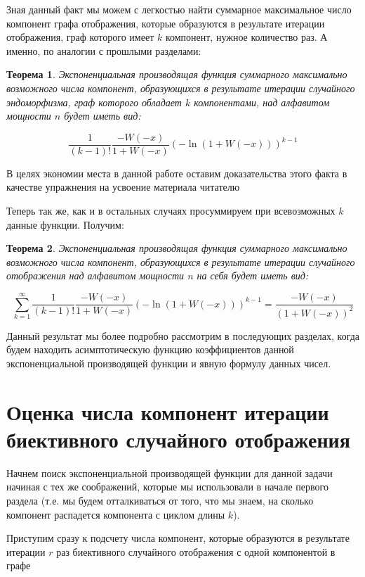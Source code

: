 \documentclass[10pt, a4paper]{report}
\newtheorem{theorem}{Теорема}[chapter]
\theoremstyle{definition}
\renewcommand{\log}{\ln}
\begin{document}
Зная данный факт мы можем с легкостью найти суммарное максимальное число компонент графа отображения, которые образуются в результате итерации отображения, граф которого имеет $k$ компонент, нужное количество раз. А именно, по аналогии с прошлыми разделами:

\begin{theorem} 
	Экспоненциальная производящая функция суммарного максимально возможного числа компонент, образующихся в результате итерации случайного эндоморфизма, граф которого обладает $k$ компонентами, над алфавитом мощности $n$ будет иметь вид: 

$$
\frac 1 {(k-1)!} \frac{-W(-x)}{1+W(-x)} (-\log(1+W(-x)))^{k-1}
$$
\end{theorem}

В целях экономии места в данной работе оставим доказательства этого факта в качестве упражнения на усвоение материала читателю

Теперь так же, как и в остальных случаях просуммируем при всевозможных $k$ данные функции. Получим:

\begin{theorem}
	Экспоненциальная производящая функция суммарного максимально возможного числа компонент, образующихся в результате итерации случайного отображения над алфавитом мощности $n$ на себя будет иметь вид: 

$$
\sum_{k=1}^{\infty}\frac 1 {(k-1)!} \frac{-W(-x)}{1+W(-x)} (-\log(1+W(-x)))^{k-1}=
\frac{-W(-x)}{(1+W(-x))^2}
$$
\end{theorem}

Данный результат мы более подробно рассмотрим в последующих разделах, когда будем находить асимптотическую функцию коэффициентов данной экспоненциальной производящей функции и явную формулу данных чисел.

\section{Оценка числа компонент итерации биективного случайного отображения}

Начнем поиск экспоненциальной производящей функции для данной задачи начиная с тех же соображений, которые мы использовали в начале первого раздела (т.е. мы будем отталкиваться от того, что мы знаем, на сколько компонент  распадется компонента с циклом длины $k$). 

Приступим сразу к подсчету числа компонент, которые образуются в результате итерации $r$ раз биективного случайного отображения с одной компонентой в графе
\end{document}
